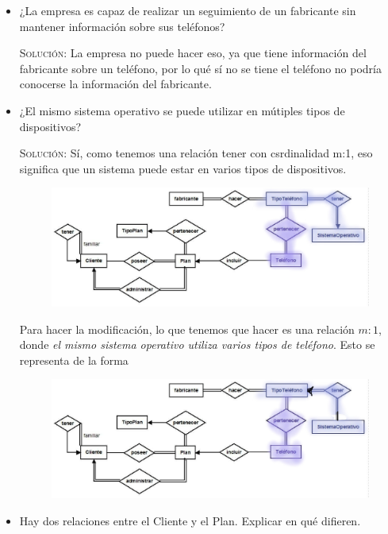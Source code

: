 \documentclass[letterpaper,11pt]{article}
\begin{document}
\begin{itemize}
    \item ¿La empresa es capaz de realizar un seguimiento de un fabricante sin
    mantener información sobre sus teléfonos?

    \textsc{Solución:} La empresa no puede hacer eso, ya que tiene información del fabricante sobre un teléfono, por lo qué sí no se tiene el teléfono no podría conocerse la información del fabricante.

    \item ¿El mismo sistema operativo se puede utilizar en mútiples tipos de
    dispositivos?

    \textsc{Solución:} Sí, como tenemos una relación tener con csrdinalidad  m:1, eso significa que un sistema puede estar en varios tipos de dispositivos.

    \begin{figure}[H]
        \centering
        \includegraphics[scale=0.4]{./imagenes/modelo9.jpg}
    \end{figure}

    Para hacer la modificación, lo que tenemos que hacer es una relación $m:1$,
    donde \textit{el mismo sistema operativo utiliza varios tipos de teléfono}.
    Esto se representa de la forma

    \begin{figure}[H]
        \centering
        \includegraphics[scale=0.4]{./imagenes/modelo9i.jpg}
    \end{figure}

    \item Hay dos relaciones entre el Cliente y el Plan. Explicar en qué
    difieren.


\end{itemize}
\end{document}
